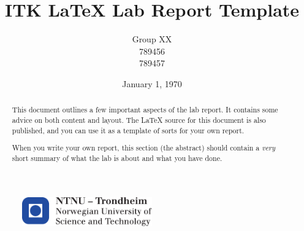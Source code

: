 \documentclass[11pt, a4paper, USenglish]{article} %
\title{ITK LaTeX Lab Report Template}
\author{Group XX\\789456 \\789457 }
\date{January 1, 1970}
\begin{document}
\begin{titlepage}
    \maketitle
    \begin{figure}
    \centering
    \includegraphics[width=0.5\textwidth]{figures/logontnu_eng}
    \end{figure}
    \thispagestyle{empty}
\end{titlepage}

\begin{abstract} 
This document outlines a few important aspects of the lab report. It contains some advice on both content and layout. The \LaTeX{} source for this document is also published, and you can use it as a template of sorts for your own report.

When you write your own report, this section (the abstract) should contain a \emph{very} short summary of what the lab is about and what you have done.
\end{abstract}
\thispagestyle{empty} %
\newpage

\tableofcontents
\thispagestyle{empty} %
\newpage

\setcounter{page}{1}




\appendix



\newpage
{} %
\printbibliography
\end{document}

